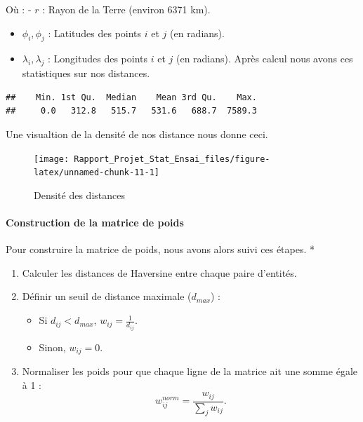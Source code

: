 \documentclass[
]{article}
\providecommand{\tightlist}{%
  \setlength{\itemsep}{0pt}\setlength{\parskip}{0pt}}
\begin{document}
Où : - \(r\) : Rayon de la Terre (environ 6371 km).

\begin{itemize}
\item
  \(\phi_i, \phi_j\) : Latitudes des points \(i\) et \(j\) (en radians).
\item
  \(\lambda_i, \lambda_j\) : Longitudes des points \(i\) et \(j\) (en
  radians). Après calcul nous avons ces statistiques sur nos distances.
\end{itemize}

\begin{verbatim}
##    Min. 1st Qu.  Median    Mean 3rd Qu.    Max. 
##     0.0   312.8   515.7   531.6   688.7  7589.3
\end{verbatim}

Une visualtion de la densité de nos distance nous donne ceci.

\begin{figure}

{\centering \texttt{[image: Rapport\_Projet\_Stat\_Ensai\_files/figure-latex/unnamed-chunk-11-1]} 

}

\caption{Densité des distances}\label{fig:unnamed-chunk-11}
\end{figure}

\hypertarget{construction-de-la-matrice-de-poids}{%
\paragraph{Construction de la matrice de
poids}\label{construction-de-la-matrice-de-poids}}

Pour construire la matrice de poids, nous avons alors suivi ces étapes.
*

\begin{enumerate}
\def\labelenumi{\arabic{enumi}.}
\tightlist
\item
  Calculer les distances de Haversine entre chaque paire d'entités.
\item
  Définir un seuil de distance maximale (\(d_{max}\)) :

  \begin{itemize}
  \tightlist
  \item
    Si \(d_{ij} < d_{max}\), \(w_{ij} = \frac{1}{d_{ij}}\).
  \item
    Sinon, \(w_{ij} = 0\).
  \end{itemize}
\item
  Normaliser les poids pour que chaque ligne de la matrice ait une somme
  égale à 1 : \[
   w_{ij}^{norm} = \frac{w_{ij}}{\sum_{j} w_{ij}}.
  \]
\end{enumerate}
\end{document}
